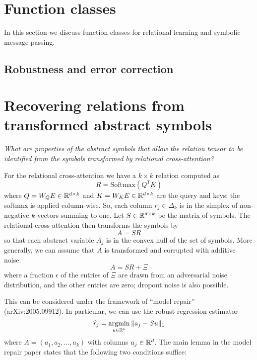 
\section{Function classes}
\label{sec:functions}

\def\rdot{\bigcdot}
\def\F{{\mathfrak{F}}}

In this section we discuss function classes for relational learning and symbolic message passing.

\subsection{Robustness and error correction}

\section{Recovering relations from transformed abstract symbols}

\textit{What are properties of the abstract symbols that allow the relation tensor 
to be identified from the symbols transformed by relational cross-attention?}

For the relational cross-attention we have a $k\times k$ relation 
computed as 
\begin{equation}
  R = \mbox{Softmax}(Q^T K)
\end{equation}
where $Q = W_Q E\in \mathbb{R}^{d\times k}$ and $K = W_K E\in \mathbb{R}^{d\times k}$ are the query and keys; the softmax is applied column-wise. So, each column $r_j \in \Delta_k$ is in the simplex of 
non-negative $k$-vectors summing to one. Let $S\in\mathbb{R}^{d\times k}$ be
the matrix of symbols. The relational cross attention then transforms the symbols by 
\begin{equation}
  A = SR
\end{equation}
so that each abstract variable $A_j$ is in the convex hull of the set of symbols.
More generally, we can assume that $A$ is transformed and corrupted with additive noise:
\begin{equation}
  A = SR + \Xi
\end{equation}
where a fraction $\epsilon$ of the entries of $\Xi$ are drawn from an adversarial noise distribution, and the other entries are zero; dropout noise is also possible.

This can be considered under the framework of ``model repair'' (arXiv:2005.09912). In particular, we can use the  robust regression estimator
\begin{equation}
  \hat r_j = \argmin_{u \in\reals^k} \| a_j - S u\|_1 \label{eq:lp}
\end{equation}
where $A = (a_1,a_2,\ldots, a_k)$ with columns $a_j\in\mathbb{R}^d$.
The main lemma in the model repair paper states that the following two conditions suffice:

